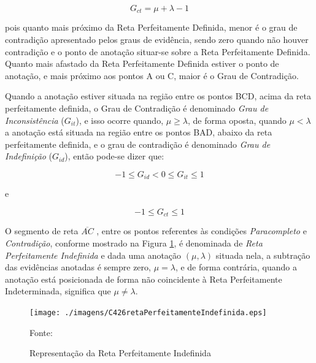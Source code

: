 \begin{center}
\begin{equation}
G _{ct} = \mu + \lambda - 1
\label{eq:grauContradicao}
\end{equation}
\end{center}

pois quanto mais próximo da Reta Perfeitamente Definida, menor é o grau de contradição apresentado pelos graus de evidência, sendo zero quando não houver contradição e o ponto de anotação situar-se sobre a Reta Perfeitamente Definida. 
Quanto mais afastado da Reta Perfeitamente Definida estiver o ponto de anotação, e mais próximo aos pontos A ou C, maior é o Grau de Contradição. 

Quando a anotação estiver situada na região entre os pontos BCD, acima da reta perfeitamente definida, o Grau de Contradição é denominado 
\emph{Grau de Inconsistência} ($G_{it}$), 
e isso ocorre quando, $\mu \ge \lambda $, de forma oposta, quando $\mu < \lambda $ a anotação está situada na região entre os pontos BAD, abaixo da reta perfeitamente definida, e o grau de contradição é denominado 
\emph{Grau de Indefinição} ($G_{id}$), 
então pode-se dizer que:

\begin{center}
\begin{equation}
-1 \le G _{id}  <  0 \le G _{it} \le 1
\label{eq:grauInconsistenciaIndefinicao}
\end{equation}
\end{center}
e
\begin{center}
\begin{equation}
-1 \le G _{ct} \le 1
\label{eq:grauInconsistenciaIndefinicao1}
\end{equation}
\end{center}


O segmento de reta $\overline{ AC }$ , entre os pontos referentes às condições \emph{Paracompleto} e \emph{Contradição}, conforme mostrado na Figura \ref{fig:retaPerfeitamenteIndefinida}, é denominada de \emph{Reta Perfeitamente Indefinida} e dada uma anotação $(\mu, \lambda )$ situada nela, a subtração das evidências anotadas é sempre zero, $\mu = \lambda$, e de forma contrária, quando a anotação está posicionada de forma não coincidente à Reta Perfeitamente Indeterminada, significa que $\mu \neq \lambda$.

\begin{figure}[!htb]
\caption{Representação da Reta Perfeitamente Indefinida}
\center\texttt{[image: ./imagens/C426retaPerfeitamenteIndefinida.eps]}
\label{fig:retaPerfeitamenteIndefinida}

{\small Fonte: \cite{JoaoInacio} }
\end{figure}

